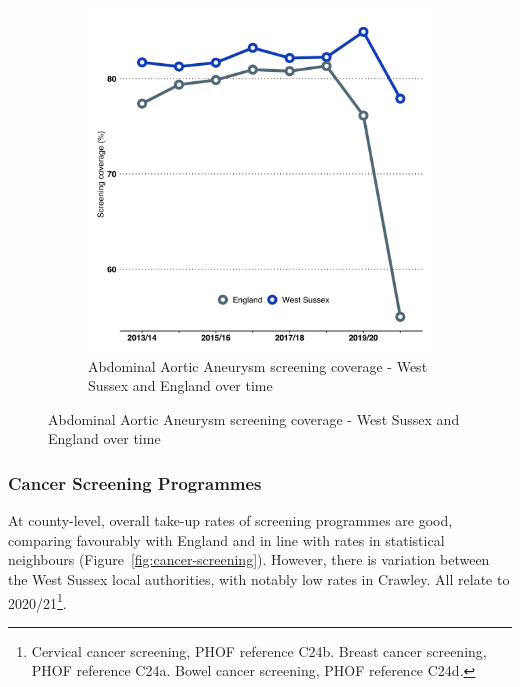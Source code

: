 \begin{figure}[H]
\begin{subfigure}[b]{0.49\linewidth}
        \centering
        \includegraphics[width=\linewidth]{images/aaa_time.png}
        \caption{Abdominal Aortic Aneurysm screening coverage - West Sussex and England over time}
        \label{fig:aaa:time}        
    \end{subfigure}
    \vspace*{3mm}
\end{figure}

\subsubsection{Cancer Screening Programmes}
At county-level, overall take-up rates of screening programmes are good, comparing favourably with England and in line with rates in statistical neighbours (Figure~\ref{fig:cancer-screening}). However, there is variation between the West Sussex local authorities, with notably low rates in Crawley. All relate to 2020/21\footnote{Cervical cancer screening, PHOF reference C24b. Breast cancer screening, PHOF reference C24a. Bowel cancer screening, PHOF reference C24d.}.

